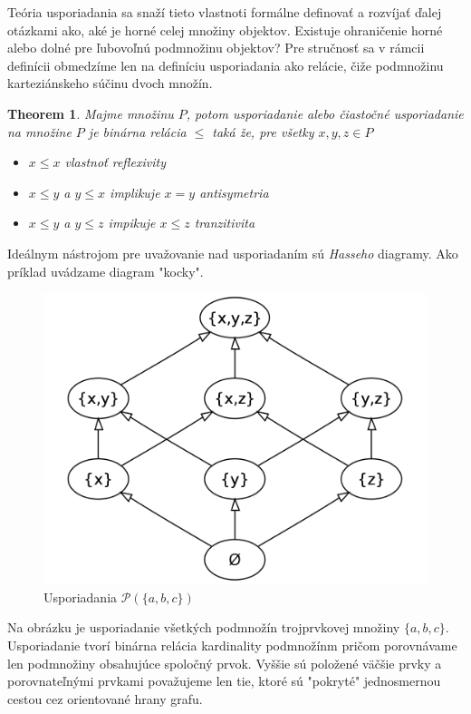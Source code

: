 \documentclass[a4paper,10pt,oneside]{report}%
\newtheorem{theorem}{Theorem}
\begin{document}
Teória usporiadania sa snaží tieto vlastnoti formálne definovať a rozvíjať ďalej
otázkami ako, aké je horné celej množiny objektov. Existuje ohraničenie horné alebo
dolné pre ľubovoľnú podmnožinu objektov?
    Pre stručnosť sa v rámcii definícii obmedzíme len na definíciu usporiadania
ako relácie, čiže podmnožinu karteziánskeho súčinu dvoch množín.

\begin{theorem}
    Majme množinu $P$, potom usporiadanie alebo čiastočné usporiadanie na množine
    $P$ je binárna relácia $\leq$ taká že, pre všetky $x,y,z \in P$
    \begin{itemize}
        \item $x \leq x$ vlastnoť reflexivity
        \item $x \leq y$ a $y \leq x$ implikuje $x = y$ antisymetria
        \item $x \leq y$ a $y \leq z$ impikuje $x \leq z$ tranzitivita
    \end{itemize}
\end{theorem}

    Ideálnym nástrojom pre uvažovanie nad usporiadaním sú \emph{Hasseho} diagramy.
    Ako príklad uvádzame diagram "kocky".

\begin{figure}[!ht]
    \centering
    \includegraphics[scale=0.15]{cube.png}
    \caption{Usporiadania $\mathcal{P}(\{a,b,c\})$}
\end{figure}

    Na obrázku je usporiadanie všetkých podmnožín trojprvkovej množiny $\{ a,b,c \}$.
    Usporiadanie tvorí binárna relácia kardinality podmnožínm pričom porovnávame
len podmnožiny obsahujúce spoločný prvok.
    Vyššie sú položené väčšie prvky a porovnateľnými prvkami považujeme len tie,
ktoré sú "pokryté" jednosmernou cestou cez orientované hrany grafu.
\end{document}
